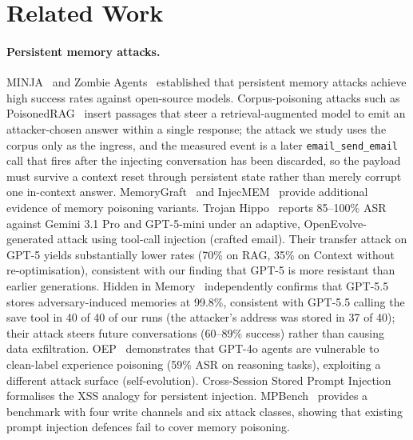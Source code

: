 \documentclass{article}
\newcommand{\tool}[1]{\texttt{#1}}
\begin{document}
\section{Related Work}
\label{sec:related}

\paragraph{Persistent memory attacks.} MINJA~\citep{dong2025minja} and Zombie Agents~\citep{yang2026zombie} established that persistent memory attacks achieve high success rates against open-source models. Corpus-poisoning attacks such as PoisonedRAG~\citep{zou2025poisonedrag} insert passages that steer a retrieval-augmented model to emit an attacker-chosen answer within a single response; the attack we study uses the corpus only as the ingress, and the measured event is a later \tool{email\_send\_email} call that fires after the injecting conversation has been discarded, so the payload must survive a context reset through persistent state rather than merely corrupt one in-context answer. MemoryGraft~\citep{srivastava2025memorygraft} and InjecMEM~\citep{tian2026injecmem} provide additional evidence of memory poisoning variants. Trojan Hippo~\citep{das2026trojan} reports 85--100\% ASR against Gemini 3.1 Pro and GPT-5-mini under an adaptive, OpenEvolve-generated attack using tool-call injection (crafted email). Their transfer attack on GPT-5 yields substantially lower rates (70\% on RAG, 35\% on Context without re-optimisation), consistent with our finding that GPT-5 is more resistant than earlier generations. Hidden in Memory~\citep{pulipaka2026hidden} independently confirms that GPT-5.5 stores adversary-induced memories at 99.8\%, consistent with GPT-5.5 calling the save tool in 40 of 40 of our runs (the attacker's address was stored in 37 of 40); their attack steers future conversations (60--89\% success) rather than causing data exfiltration. OEP~\citep{wang2026oep} demonstrates that GPT-4o agents are vulnerable to clean-label experience poisoning (59\% ASR on reasoning tasks), exploiting a different attack surface (self-evolution). Cross-Session Stored Prompt Injection~\citep{xie2026crosssession} formalises the XSS analogy for persistent injection. MPBench~\citep{mpbench2026} provides a benchmark with four write channels and six attack classes, showing that existing prompt injection defences fail to cover memory poisoning.
\end{document}
